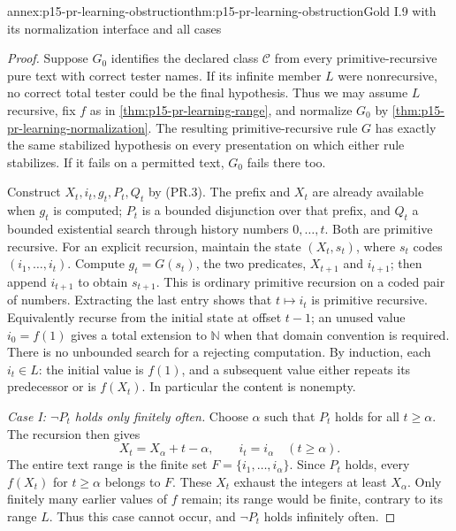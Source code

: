 \begin{annexitem}{annex:p15-pr-learning-obstruction}{thm:p15-pr-learning-obstruction}{Gold I.9 with its normalization interface and all cases}
\begin{proof}
Suppose \(G_0\) identifies the declared class
\(\mathcal C\) from every primitive-recursive pure text
with correct tester names. If its infinite member \(L\)
were nonrecursive, no correct total tester could be
the final hypothesis. Thus we may assume \(L\)
recursive, fix \(f\) as in
\cref{thm:p15-pr-learning-range}, and normalize \(G_0\)
by \cref{thm:p15-pr-learning-normalization}.
The resulting primitive-recursive rule \(G\)
has exactly the same stabilized hypothesis on
every presentation on which either rule stabilizes.
If it fails on a permitted text, \(G_0\) fails there too.

Construct \(X_t,i_t,g_t,P_t,Q_t\) by (PR.3).
The prefix and \(X_t\) are already available when
\(g_t\) is computed; \(P_t\) is a bounded disjunction
over that prefix, and \(Q_t\) a bounded existential
search through history numbers \(0,\ldots,t\).
Both are primitive recursive.
For an explicit recursion, maintain the state
\((X_t,s_t)\), where \(s_t\) codes
\((i_1,\ldots,i_t)\).
Compute \(g_t=G(s_t)\), the two predicates,
\(X_{t+1}\) and \(i_{t+1}\); then append
\(i_{t+1}\) to obtain \(s_{t+1}\).
This is ordinary primitive recursion on a coded
pair of numbers. Extracting the last entry shows
that \(t\mapsto i_t\) is primitive recursive.
Equivalently recurse from the initial state at offset \(t-1\);
an unused value \(i_0=f(1)\) gives a total extension to
\(\mathbb N\) when that domain convention is required.
There is no unbounded search for a rejecting computation.
By induction, each \(i_t\in L\):
the initial value is \(f(1)\), and a subsequent
value either repeats its predecessor or is \(f(X_t)\).
In particular the content is nonempty.

\emph{Case I: \(\neg P_t\) holds only finitely often.}
Choose \(\alpha\) such that \(P_t\) holds for all
\(t\geq\alpha\).
The recursion then gives
\[
 X_t=X_\alpha+t-\alpha,\qquad
 i_t=i_\alpha\quad(t\geq\alpha).
\]
The entire text range is the finite set
\(F=\{i_1,\ldots,i_\alpha\}\).
Since \(P_t\) holds, every \(f(X_t)\) for
\(t\geq\alpha\) belongs to \(F\).
These \(X_t\) exhaust the integers at least \(X_\alpha\).
Only finitely many earlier values of \(f\) remain;
its range would be finite, contrary to its range \(L\).
Thus this case cannot occur, and \(\neg P_t\)
holds infinitely often.


\end{proof}
\end{annexitem}
